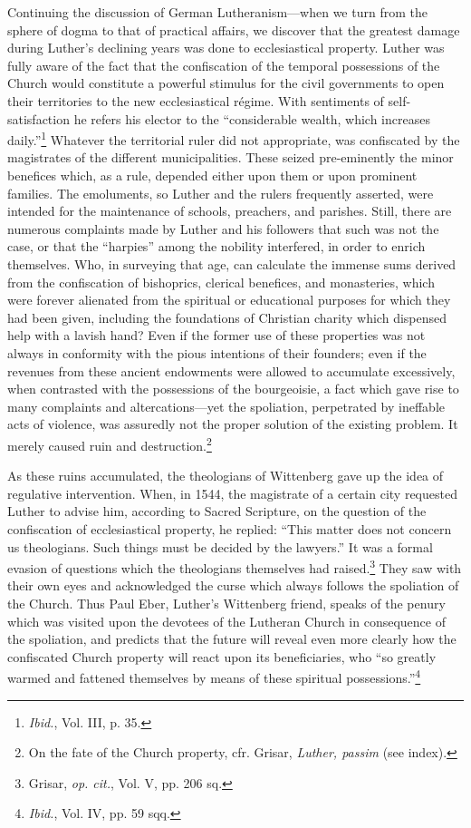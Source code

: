 Continuing the discussion of German Lutheranism—when we turn
from the sphere of dogma to that of practical affairs, we discover
that the greatest damage during Luther’s declining years was done to
ecclesiastical property. Luther was fully aware of the fact that the
confiscation of the temporal possessions of the Church would constitute
a powerful stimulus for the civil governments to open their territories
to the new ecclesiastical régime. With sentiments of self-satisfaction
he refers his elector to the “considerable wealth, which
increases daily.”\footnote{\textit{Ibid.}, Vol. III, p. 35.}
 Whatever the territorial ruler did not appropriate,
was confiscated by the magistrates of the different municipalities. These
seized pre-eminently the minor benefices which, as a rule,
depended either upon them or upon prominent families. The emoluments,
so Luther and the rulers frequently asserted, were intended
for the maintenance of schools, preachers, and parishes. Still, there
are numerous complaints made by Luther and his followers that such
was not the case, or that the “harpies” among the nobility interfered,
in order to enrich themselves. Who, in surveying that age, can calculate
the immense sums derived from the confiscation of bishoprics,
clerical benefices, and monasteries, which were forever alienated
from the spiritual or educational purposes for which they had been
given, including the foundations of Christian charity which dispensed
help with a lavish hand? Even if the former use of these
properties was not always in conformity with the pious intentions
of their founders; even if the revenues from these ancient endowments
were allowed to accumulate excessively, when contrasted with
the possessions of the bourgeoisie, a fact which gave rise to many
complaints and altercations—yet the spoliation, perpetrated by ineffable
acts of violence, was assuredly not the proper solution of the
existing problem. It merely caused ruin and destruction.\footnote
{On the fate of the Church property, cfr. Grisar, \textit{Luther, passim} (see index).}

As these ruins accumulated, the theologians of Wittenberg gave up
the idea of regulative intervention. When, in 1544, the magistrate
of a certain city requested Luther to advise him, according to Sacred
Scripture, on the question of the confiscation of ecclesiastical property,
he replied: “This matter does not concern us theologians. Such
things must be decided by the lawyers.” It was a formal evasion of
questions which the theologians themselves had raised.\footnote{Grisar, \textit{op. cit.}, Vol. V, pp. 206 sq.}
They saw with their own eyes and acknowledged the curse which always follows
the spoliation of the Church. Thus Paul Eber, Luther’s Wittenberg
friend, speaks of the penury which was visited upon the devotees
of the Lutheran Church in consequence of the spoliation, and predicts
that the future will reveal even more clearly how the confiscated Church
property will react upon its beneficiaries, who “so
greatly warmed and fattened themselves by means of these spiritual
possessions.”\footnote{\textit{Ibid.}, Vol. IV, pp. 59 sqq.}

